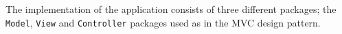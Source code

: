 The implementation of the application consists of three different packages; the \texttt{Model}, \texttt{View} and \texttt{Controller} packages used as in the MVC design pattern.